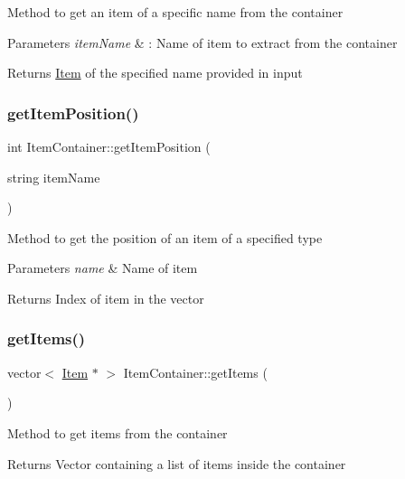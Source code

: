 Method to get an item of a specific name from the container 
\begin{DoxyParams}{Parameters}
{\em item\+Name} & \+: Name of item to extract from the container \\
\hline
\end{DoxyParams}
\begin{DoxyReturn}{Returns}
\hyperlink{class_item}{Item} of the specified name provided in input 
\end{DoxyReturn}
\hypertarget{class_item_container_a8aba27005f95301bad0b64ac3c4c0a03}{}\label{class_item_container_a8aba27005f95301bad0b64ac3c4c0a03} 
\subsubsection{\texorpdfstring{get\+Item\+Position()}{getItemPosition()}}
{\footnotesize\ttfamily int Item\+Container\+::get\+Item\+Position (\begin{DoxyParamCaption}\item[{string}]{item\+Name }\end{DoxyParamCaption})}

Method to get the position of an item of a specified type 
\begin{DoxyParams}{Parameters}
{\em name} & Name of item \\
\hline
\end{DoxyParams}
\begin{DoxyReturn}{Returns}
Index of item in the vector 
\end{DoxyReturn}
\hypertarget{class_item_container_af3f935fb769b4ab37b0dc63d1ad68102}{}\label{class_item_container_af3f935fb769b4ab37b0dc63d1ad68102} 
\subsubsection{\texorpdfstring{get\+Items()}{getItems()}}
{\footnotesize\ttfamily vector$<$ \hyperlink{class_item}{Item} $\ast$ $>$ Item\+Container\+::get\+Items (\begin{DoxyParamCaption}{ }\end{DoxyParamCaption})}

Method to get items from the container \begin{DoxyReturn}{Returns}
Vector containing a list of items inside the container 
\end{DoxyReturn}
\hypertarget{class_item_container_a518fcd2c8f83876eee5dc45543101529}{}\label{class_item_container_a518fcd2c8f83876eee5dc45543101529} 
